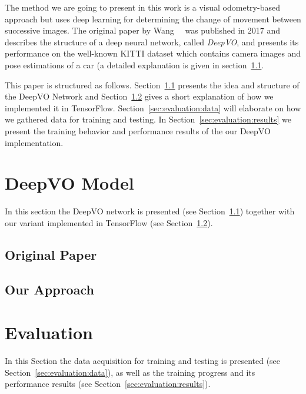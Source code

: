 \documentclass[a4paper,11pt]{article}
\begin{document}
The method we are going to present in this work is a visual odometry-based approach but uses deep learning for determining the change of movement between successive images. The original paper by Wang~\etal~\cite{wang2017deepvo} was published in 2017 and describes the structure of a deep neural network, called \emph{DeepVO}, and presents its performance on the well-known KITTI dataset which contains camera images and pose estimations of a car (a detailed explanation is given in section~\ref{sec:deepvo:original}.

This paper is structured as follows. Section~\ref{sec:deepvo:original} presents the idea and structure of the DeepVO Network and Section~\ref{sec:deepvo:approach} gives a short explanation of how we implemented it in TensorFlow. Section~\ref{sec:evaluation:data} will elaborate on how we gathered data for training and testing. In Section~\ref{sec:evaluation:results} we present the training behavior and performance results of the our DeepVO implementation.


\section{DeepVO Model}
\label{sec:deepvo}
In this section the DeepVO network is presented (see Section~\ref{sec:deepvo:original}) together with our variant implemented in TensorFlow (see Section~\ref{sec:deepvo:approach}).


\subsection{Original Paper}
\label{sec:deepvo:original}


\subsection{Our Approach}
\label{sec:deepvo:approach}


\section{Evaluation}
\label{sec:evaluation}
In this Section the data acquisition for training and testing is presented (see Section~\ref{sec:evaluation:data}), as well as the training progress and its performance results (see Section~\ref{sec:evaluation:results}).
\end{document}

